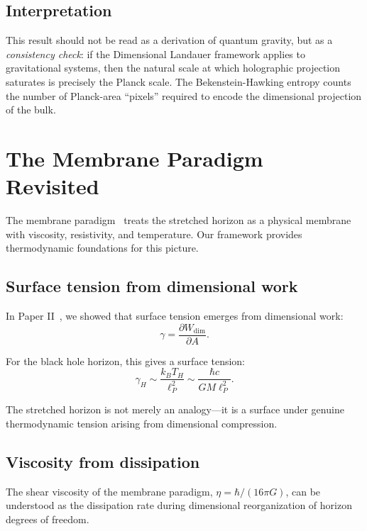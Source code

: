 \documentclass[aps,prd,twocolumn,superscriptaddress,floatfix]{revtex4-2}
\begin{document}
\subsection{Interpretation}

This result should not be read as a derivation of quantum gravity, but as a \emph{consistency check}: if the Dimensional Landauer framework applies to gravitational systems, then the natural scale at which holographic projection saturates is precisely the Planck scale. The Bekenstein-Hawking entropy counts the number of Planck-area ``pixels'' required to encode the dimensional projection of the bulk.

\section{The Membrane Paradigm Revisited}

The membrane paradigm~\cite{thorne1986} treats the stretched horizon as a physical membrane with viscosity, resistivity, and temperature. Our framework provides thermodynamic foundations for this picture.

\subsection{Surface tension from dimensional work}

In Paper II~\cite{todd2025surfaces}, we showed that surface tension emerges from dimensional work:
\begin{equation}
\gamma = \frac{\partial W_{\mathrm{dim}}}{\partial A}.
\end{equation}

For the black hole horizon, this gives a surface tension:
\begin{equation}
\gamma_H \sim \frac{k_B T_H}{\ell_P^2} \sim \frac{\hbar c}{G M \ell_P^2}.
\end{equation}

The stretched horizon is not merely an analogy---it is a surface under genuine thermodynamic tension arising from dimensional compression.

\subsection{Viscosity from dissipation}

The shear viscosity of the membrane paradigm, $\eta = \hbar/(16\pi G)$, can be understood as the dissipation rate during dimensional reorganization of horizon degrees of freedom.
\end{document}
